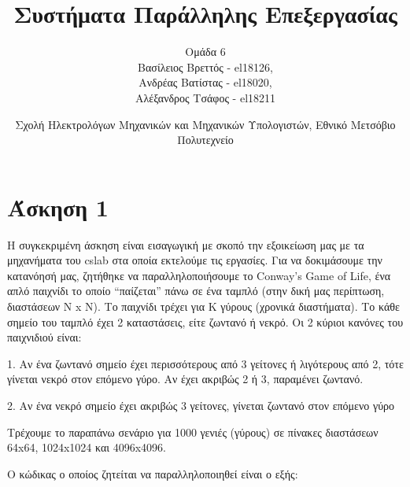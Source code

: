 \documentclass[letterpaper,12pt]{article}
\begin{document}
\title{Συστήματα Παράλληλης Επεξεργασίας}
\author{Ομάδα 6 \\
Βασίλειος Βρεττός - el18126, \\
Ανδρέας Βατίστας - el18020, \\
Αλέξανδρος Τσάφος - el18211\\}
\date{Σχολή Ηλεκτρολόγων Μηχανικών και Μηχανικών Υπολογιστών, Εθνικό Μετσόβιο Πολυτεχνείο}
\maketitle




\section{Άσκηση 1}
Η συγκεκριμένη άσκηση είναι εισαγωγική με σκοπό την εξοικείωση μας με τα μηχανήματα του cslab στα οποία εκτελούμε τις εργασίες. Για να δοκιμάσουμε την κατανόησή μας, ζητήθηκε να παραλληλοποιήσουμε το Conway’s Game of Life, ένα απλό παιχνίδι το οποίο “παίζεται” πάνω σε ένα ταμπλό (στην δική μας περίπτωση, διαστάσεων N x N). Το παιχνίδι τρέχει για Κ γύρους (χρονικά διαστήματα). Το κάθε σημείο του ταμπλό έχει 2 καταστάσεις, είτε ζωντανό ή νεκρό. Οι 2 κύριοι κανόνες του παιχνιδιού είναι: \newline

1.	Αν ένα ζωντανό σημείο έχει περισσότερους από 3 γείτονες ή λιγότερους από 2, τότε γίνεται νεκρό στον επόμενο γύρο. Αν έχει ακριβώς 2 ή 3, παραμένει ζωντανό. 

2.	Αν ένα νεκρό σημείο έχει ακριβώς 3 γείτονες, γίνεται ζωντανό στον επόμενο γύρο \newline

Τρέχουμε το παραπάνω σενάριο για 1000 γενιές (γύρους) σε πίνακες διαστάσεων 64x64, 1024x1024 και 4096x4096.

Ο κώδικας ο οποίος ζητείται να παραλληλοποιηθεί είναι ο εξής:
\end{document}
